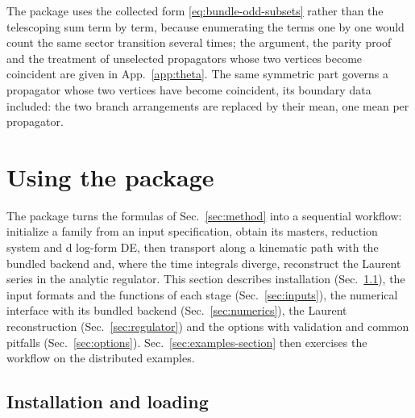 \documentclass[11pt,a4paper]{article}
\numberwithin{table}{section}
\begin{document}
The package uses the collected form \eqref{eq:bundle-odd-subsets} rather than the telescoping sum term
by term, because enumerating the terms one by one would count the same sector transition
several times; the argument, the parity proof and the treatment of unselected propagators whose two vertices
become coincident are given in App.~\ref{app:theta}. The same symmetric part governs a propagator whose
two vertices have become coincident, its boundary data included: the two branch arrangements are
replaced by their mean, one mean per propagator.



\section{Using the package}
\label{sec:usage}

The package turns the formulas of Sec.~\ref{sec:method} into a sequential workflow: initialize
a family from an input specification, obtain its masters, reduction system and d log-form DE,
then
transport along a kinematic path with the bundled backend and, where the time integrals
diverge, reconstruct the Laurent series in the analytic regulator. This section describes
installation (Sec.~\ref{sec:overview}), the input formats and the functions of each stage
(Sec.~\ref{sec:inputs}), the numerical interface with its bundled backend (Sec.~\ref{sec:numerics}),
the Laurent reconstruction (Sec.~\ref{sec:regulator}) and the options with validation
and common pitfalls (Sec.~\ref{sec:options}). Sec.~\ref{sec:examples-section} then exercises
the workflow on the distributed examples.

\subsection{Installation and loading}
\label{sec:overview}
\end{document}
